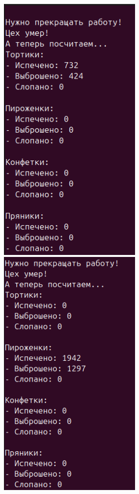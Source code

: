 \documentclass[a4paper,14pt]{extarticle}
\begin{document}
\includegraphics[width=70mm]{processes_output_2_1}
\includegraphics[width=70mm]{processes_output_2_2}
\end{document}
